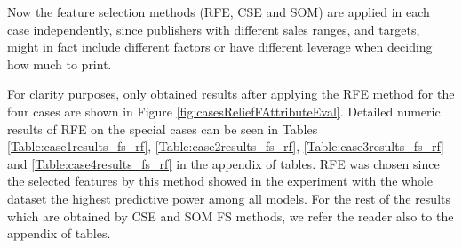 \documentclass[a4paper,10pt,twocolumn,preprint,3p]{elsarticle}
\begin{document}
Now the feature selection methods (RFE, CSE and SOM) are applied in each case
independently, since publishers with different sales ranges, and targets, might in fact include different factors or have different leverage when deciding how much to print. 



For clarity purposes, only obtained results after applying the RFE method for the 
four cases are shown in Figure \ref{fig:casesReliefFAttributeEval}.
Detailed numeric results of RFE on the special cases can be seen in 
Tables \ref{Table:case1results_fs_rf}, \ref{Table:case2results_fs_rf}, 
\ref{Table:case3results_fs_rf} and \ref{Table:case4results_fs_rf}
in the appendix of tables. 
RFE was chosen since the selected features by this method showed in the experiment with the whole dataset the highest predictive power among all models.
For the rest of the results which are obtained by CSE and SOM FS methods, we refer the reader also to the appendix of tables.
\end{document}
